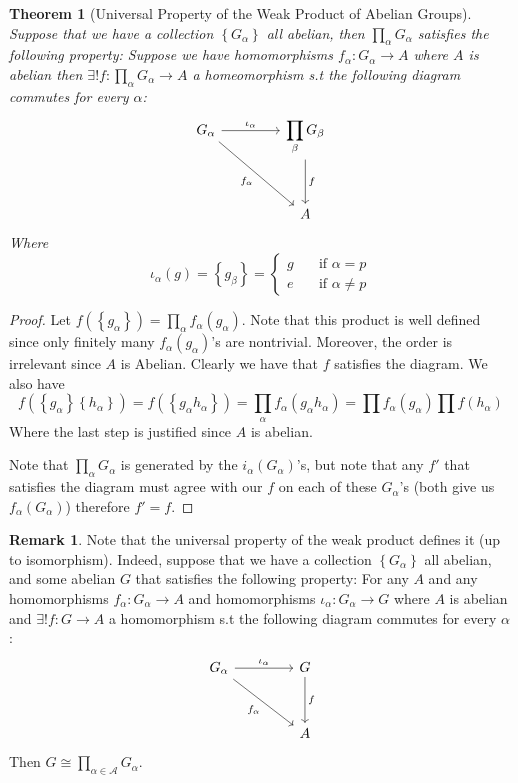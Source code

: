 \documentclass[11pt,a4paper]{article}
\theoremstyle{definition}
\newtheorem{remark}[definition]{Remark}
\theoremstyle{plain}
\newtheorem{theorem}[definition]{Theorem}
\theoremstyle{remark}
\renewcommand{\set}[1]{\left\{ #1 \right\}}
\newcommand{\1}{\mathbbm{1}}
\begin{document}
\begin{theorem}[Universal Property of the Weak Product of Abelian Groups]
    Suppose that we have a collection $\set{G_\alpha}$ all abelian, then $\prod_{\alpha} G_\alpha$ satisfies the following property: 
    Suppose we have homomorphisms $f_\alpha \colon G_\alpha \to A$ where $A$ is abelian then $\exists ! f \colon \prod_\alpha G_\alpha \to A$ a homeomorphism 
    s.t the following diagram commutes for every $\alpha$: 
    $$\begin{tikzcd}[row sep=3.2em, column sep=4.2em]
    G_\alpha \arrow[r, "\iota_\alpha"] \arrow[dr, swap, "f_\alpha"] & \displaystyle\prod_{\beta} G_\beta \arrow[d, "f"] \\
    & A
    \end{tikzcd}$$
    Where
    $$\iota_\alpha (g) = \set{g_\beta} = \begin{cases}
        g \quad &\text{if } \alpha = p \\
        e \quad &\text{if } \alpha \ne p
    \end{cases}$$
\end{theorem}

\begin{proof}
    Let $f \left(\set{g_\alpha}\right) = \prod_\alpha f_\alpha (g_\alpha)$. Note that this product is well defined since only finitely many $f_\alpha(g_\alpha)$'s are nontrivial. 
    Moreover, the order is irrelevant since $A$ is Abelian. Clearly we have that $f$ satisfies the diagram. We also have 
    $$f(\set{g_\alpha} \set{h_\alpha}) = f(\set{g_\alpha h_\alpha}) = \prod_\alpha f_\alpha(g_\alpha h_\alpha) = \prod f_\alpha (g_\alpha) \prod f(h_\alpha)$$
    Where the last step is justified since $A$ is abelian.  

    Note that $\prod_\alpha G_\alpha$ is generated by the $i_\alpha (G_\alpha)$'s, but note that any $f'$ that satisfies the diagram must agree with our $f$ on each of 
    these $G_\alpha$'s (both  give us $f_\alpha (G_\alpha)$) therefore $f' = f$. 
\end{proof}

\begin{remark}
    Note that the universal property of the weak product defines it (up to isomorphism). Indeed,
    suppose that we have a collection $\set{G_\alpha}$ all abelian, and some abelian $G$ that satisfies the following property: 
    For any $A$ and any homomorphisms $f_\alpha \colon G_\alpha \to A$ and homomorphisms $\iota_\alpha \colon G_\alpha \to G$
    where $A$ is abelian and $\exists ! f \colon G\to A$ a homomorphism 
    s.t the following diagram commutes for every $\alpha$: 
    $$\begin{tikzcd}[row sep=3.2em, column sep=4.2em]
    G_\alpha \arrow[r, "\iota_\alpha"] \arrow[dr, swap, "f_\alpha"] & \displaystyle G\arrow[d, "f"] \\
    & A
    \end{tikzcd}$$
    Then $G \cong \prod_{\alpha \in \mathcal{A}} G_\alpha$.
\end{remark}
\end{document}
